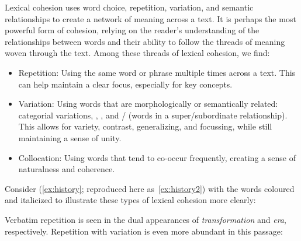 Lexical cohesion uses word choice, repetition, variation, and semantic relationships to create a network of meaning across a text. It is perhaps the most powerful form of cohesion, relying on the reader's understanding of the relationships between words and their ability to follow the threads of meaning woven through the text. Among these threads of lexical cohesion, we find:

\begin{itemize}[noitemsep]
    \item Repetition: Using the same word or phrase multiple times across a text. This can help maintain a clear focus, especially for key concepts. 
    \item Variation: Using words that are morphologically or semantically related: categorial variations, , , and / (words in a super/subordinate relationship). This allows for variety, contrast, generalizing, and focussing, while still maintaining a sense of unity. 
    
    \item Collocation: Using words that tend to co-occur frequently, creating a sense of naturalness and coherence. 
\end{itemize}

Consider (\ref{ex:history}; reproduced here as~\ref{ex:history2}) with the words coloured and italicized to illustrate these types of lexical cohesion more clearly:

\label{ex:history2}
\z
Verbatim repetition is seen in the dual appearances of \textit{\textcolor{xGreen}{transformation}} and \textit{\textcolor{xGreen}{era}}, respectively. Repetition with variation is even more abundant in this passage:

